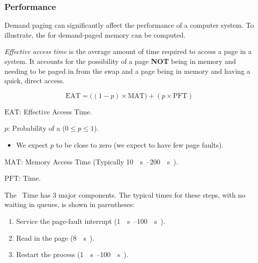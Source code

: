 \subsubsection{Performance}\label{subsubsec:Demand_Paging_Performance}
Demand paging can significantly affect the performance of a computer system.
To illustrate, the  for demand-paged memory can be computed.

\begin{definition}\label{def:Effective_Access_Time}
  \emph{Effective access time} is the average amount of time required to access a page in a  system.
  It accounts for the possibility of a page \textbf{NOT} being in memory and needing to be paged in from the swap and a page being in memory and having a quick, direct access.

  \begin{equation}\label{eq:Effective_Access_Time}
    \mathrm{EAT} = \bigl( (1-p) \times \mathrm{MAT} \bigr) + (p \times \mathrm{PFT})
  \end{equation}
  \begin{description}[noitemsep]
  \item $\mathrm{EAT}$: Effective Access Time.
  \item $p$: Probability of a  ($0 \leq p \leq 1$).
    \begin{itemize}[noitemsep]
    \item We expect $p$ to be close to zero (we expect to have few page faults).
    \end{itemize}
  \item $\mathrm{MAT}$: Memory Access Time (Typically \SIrange{10}{200}{\nano{} \second{}}).
  \item $\mathrm{PFT}$:  Time.
  \end{description}
\end{definition}

The ~Time has 3 major components.
The typical times for these steps, with no waiting in queues, is shown in parentheses:
\begin{enumerate}[noitemsep]
\item Service the page-fault interrupt (\SIrange{1}{100}{\micro{} \second{}}).
\item Read in the page (\SI{8}{\milli{} \second{}}).
\item Restart the process (\SIrange{1}{100}{\micro{} \second{}}).
\end{enumerate}

